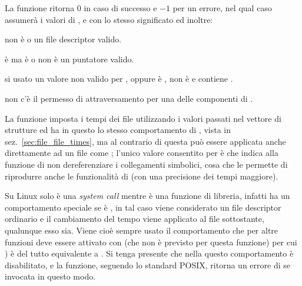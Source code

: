 \begin{funcproto}{
}

{La funzione ritorna $0$ in caso di successo e $-1$ per un errore, nel qual
  caso  assumerà i valori di ,  e
   con lo stesso significato ed inoltre:
  \begin{errlist}
  \item[\errcode{EBADF}]  non è  o un file
    descriptor valido.
  \item[\errcode{EFAULT}]  è  ma
     è  o non è un puntatore valido.
  \item[\errcode{EINVAL}] si usato un valore non valido per ,
    oppure  è ,  non è
     e  contiene .
  \item[\errcode{ESRCH}] non c'è il permesso di attraversamento per una delle
    componenti di .
  \end{errlist}
}
\end{funcproto}

La funzione imposta i tempi dei file utilizzando i valori passati nel vettore
di strutture  ed ha in questo lo stesso comportamento di
, vista in sez.~\ref{sec:file_file_times}, ma al contrario di
questa può essere applicata anche direttamente ad un file come ;
l'unico valore consentito per  è 
che indica alla funzione di non dereferenziare i collegamenti simbolici, cosa
che le permette di riprodurre anche le funzionalità di  (con una
precisione dei tempi maggiore).

Su Linux solo  è una \textit{system call} mentre
 è una funzione di libreria, infatti  ha un
comportamento speciale se  è , in tal caso
 viene considerato un file descriptor ordinario e il cambiamento
del tempo viene applicato al file sottostante, qualunque esso sia. Viene cioè
sempre usato il comportamento che per altre funzioni deve essere attivato con
 (che non è previsto per questa funzione) per cui
) è del tutto equivalente a . Si tenga presente che nella  questo comportamento è
disabilitato, e la funzione, seguendo lo standard POSIX, ritorna un errore di
 se invocata in questo modo.

